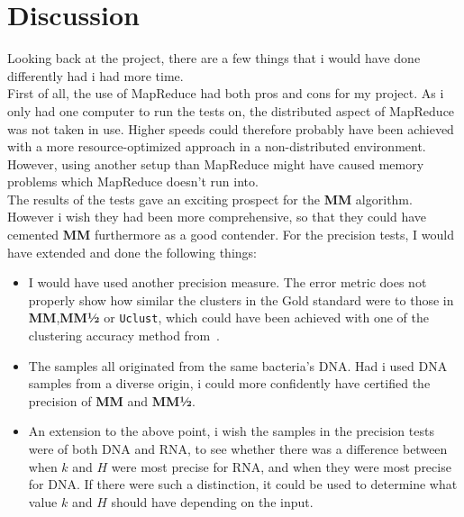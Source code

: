 \documentclass[../../main.tex]{subfiles}
\begin{document}
\section{Discussion}

Looking back at the project, there are a few things that i would have done differently had i had more time.\\

First of all, the use of MapReduce had both pros and cons for my project. As i only had one computer to run the tests on, the distributed aspect of MapReduce was not taken in use. Higher speeds could therefore probably have been achieved with a more resource-optimized approach in a non-distributed environment. However, using another setup than MapReduce might have caused memory problems which MapReduce doesn't run into.\\

The results of the tests gave an exciting prospect for the {\bf MM} algorithm. However i wish they had been more comprehensive, so that they could have cemented {\bf MM} furthermore as a good contender. For the precision tests, I would have extended and done the following things:
\begin{itemize}
\item I would have used another precision measure. The error metric does not properly show how similar the clusters in the Gold standard were to those in {\bf MM},{\bf MM½} or {\tt Uclust}, which could have been achieved with one of the clustering accuracy method from~\cite{measuringcluster}.
\item The samples all originated from the same bacteria's DNA. Had i used DNA samples from a diverse origin, i could more confidently have certified the precision of {\bf MM} and {\bf MM½}.
\item An extension to the above point, i wish the samples in the precision tests were of both DNA and RNA, to see whether there was a difference between when $k$ and $H$ were most precise for RNA, and when they were most precise for DNA. If there were such a distinction, it could be used to determine what value $k$ and $H$ should have depending on the input.    
\end{itemize}
\end{document}
